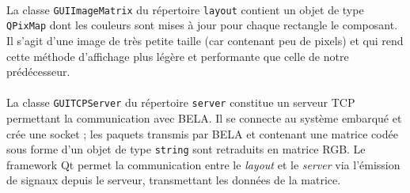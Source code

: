 
\paragraph{}
La classe \verb!GUIImageMatrix! du répertoire \verb!layout! contient
un objet de type \verb!QPixMap! dont les couleurs sont mises à jour
pour chaque rectangle le composant. Il s'agit d'une image de très
petite taille (car contenant peu de pixels) et qui rend cette méthode
d'affichage plus légère et performante que celle de notre
prédécesseur.

\paragraph{}
La classe \verb!GUITCPServer! du répertoire \verb!server! constitue un
serveur TCP permettant la communication avec BELA. Il se connecte au
système embarqué et crée une socket ; les paquets transmis par BELA et
contenant une matrice codée sous forme d'un objet de type
\verb!string! sont retraduits en matrice RGB. Le framework Qt permet
la communication entre le \textit{layout} et le \textit{server} via
l'émission de signaux depuis le serveur, transmettant les données de
la matrice.
